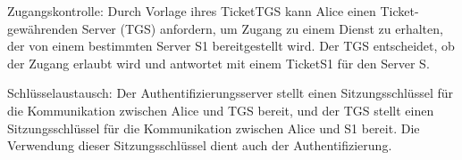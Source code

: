 \documentclass[a4paper]{article}
\begin{document}
\begin{multicols}{3}
\begin{itemize*}
\begin{itemize*}
                  \item Zugangskontrolle: Durch Vorlage ihres TicketTGS kann Alice einen Ticket-gewährenden Server (TGS) anfordern, um Zugang zu einem Dienst zu erhalten, der von einem bestimmten Server S1 bereitgestellt wird. Der TGS entscheidet, ob der Zugang erlaubt wird und antwortet mit einem TicketS1 für den Server S.
                  \item Schlüsselaustausch: Der Authentifizierungsserver stellt einen Sitzungsschlüssel für die Kommunikation zwischen Alice und TGS bereit, und der TGS stellt einen Sitzungsschlüssel für die Kommunikation zwischen Alice und S1 bereit. Die Verwendung dieser Sitzungsschlüssel dient auch der Authentifizierung.
            \end{itemize*}
      \end{itemize*}


\end{multicols}
\end{document}
